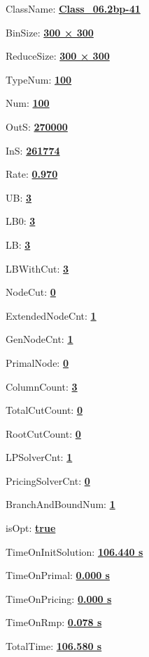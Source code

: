 \documentclass[11pt]{article}
\begin{document}
\pagestyle{empty}


ClassName: \underline{\textbf{Class_06.2bp-41}}
\par
BinSize: \underline{\textbf{300 × 300}}
\par
ReduceSize: \underline{\textbf{300 × 300}}
\par
TypeNum: \underline{\textbf{100}}
\par
Num: \underline{\textbf{100}}
\par
OutS: \underline{\textbf{270000}}
\par
InS: \underline{\textbf{261774}}
\par
Rate: \underline{\textbf{0.970}}
\par
UB: \underline{\textbf{3}}
\par
LB0: \underline{\textbf{3}}
\par
LB: \underline{\textbf{3}}
\par
LBWithCut: \underline{\textbf{3}}
\par
NodeCut: \underline{\textbf{0}}
\par
ExtendedNodeCnt: \underline{\textbf{1}}
\par
GenNodeCnt: \underline{\textbf{1}}
\par
PrimalNode: \underline{\textbf{0}}
\par
ColumnCount: \underline{\textbf{3}}
\par
TotalCutCount: \underline{\textbf{0}}
\par
RootCutCount: \underline{\textbf{0}}
\par
LPSolverCnt: \underline{\textbf{1}}
\par
PricingSolverCnt: \underline{\textbf{0}}
\par
BranchAndBoundNum: \underline{\textbf{1}}
\par
isOpt: \underline{\textbf{true}}
\par
TimeOnInitSolution: \underline{\textbf{106.440 s}}
\par
TimeOnPrimal: \underline{\textbf{0.000 s}}
\par
TimeOnPricing: \underline{\textbf{0.000 s}}
\par
TimeOnRmp: \underline{\textbf{0.078 s}}
\par
TotalTime: \underline{\textbf{106.580 s}}
\par
\newpage
\end{document}
